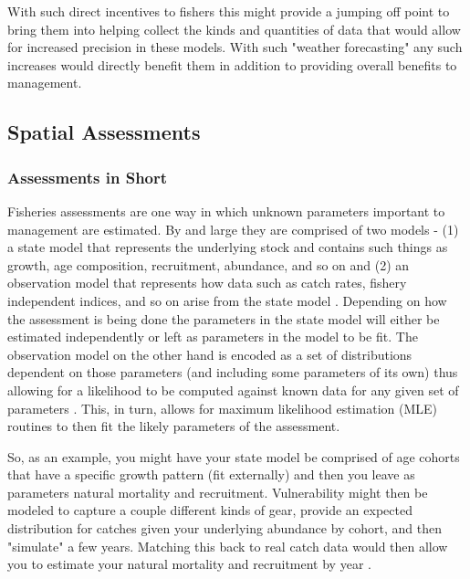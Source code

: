 \documentclass[11pt]{article}
\begin{document}
With such direct incentives to fishers this might provide a jumping off point to bring them into helping collect the kinds and quantities of data that would allow for increased precision in these models. With such "weather forecasting" any such increases would directly benefit them in addition to providing overall benefits to management. 

\newpage


\subsection{Spatial Assessments}\label{spatial_assessments}

\subsubsection{Assessments in Short}

Fisheries assessments are one way in which unknown parameters important to management are estimated. By and large they are comprised of two models - (1) a state model that represents the underlying stock and contains such things as growth, age composition, recruitment, abundance, and so on and (2) an observation model that represents how data such as catch rates, fishery independent indices, and so on arise from the state model \citep{king}. Depending on how the assessment is being done the parameters in the state model will either be estimated independently or left as parameters in the model to be fit. The observation model on the other hand is encoded as a set of distributions dependent on those parameters (and including some parameters of its own) thus allowing for a likelihood to be computed against known data for any given set of parameters \citep{sippel2014}. This, in turn, allows for maximum likelihood estimation (MLE) routines to then fit the likely parameters of the assessment. \newline

So, as an example, you might have your state model be comprised of age cohorts that have a specific growth pattern (fit externally) and then you leave as parameters natural mortality and recruitment. Vulnerability might then be modeled to capture a couple different kinds of gear, provide an expected distribution for catches given your underlying abundance by cohort, and then "simulate" a few years. Matching this back to real catch data would then allow you to estimate your natural mortality and recruitment by year \citep{king} \citep{ASAP}. \newline
\end{document}
